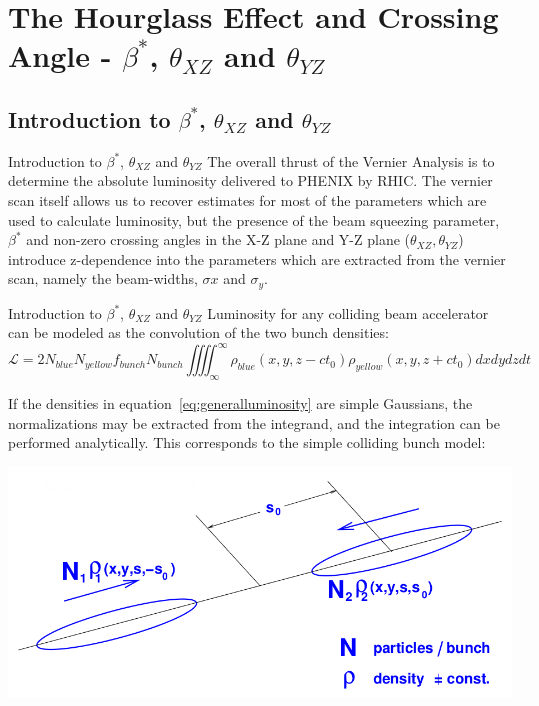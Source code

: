 \section{The Hourglass Effect and Crossing Angle - $\beta^{*}$,  $\theta_{XZ}$ and $\theta_{YZ}$ }
\label{HourglassIntro}

\subsection{Introduction to $\beta^{*}$,  $\theta_{XZ}$ and $\theta_{YZ}$ }
\label{HourglassSubIntro}

\begin{frame}{Introduction to $\beta^{*}$,  $\theta_{XZ}$ and $\theta_{YZ}$}
The overall thrust of the Vernier Analysis is to determine the absolute
luminosity delivered to PHENIX by RHIC. The vernier scan itself allows us to
recover estimates for most of the parameters which are used to calculate
luminosity, but the presence of the beam squeezing parameter, $\beta^{*}$ and
non-zero crossing angles in the X-Z plane and Y-Z plane ($\theta_{XZ},
\theta_{YZ}$) introduce z-dependence into the parameters which are extracted from
the vernier scan, namely the beam-widths, $\sigma{x}$ and $\sigma_{y}$. 
\end{frame}


\begin{frame}[shrink=20]{Introduction to $\beta^{*}$,  $\theta_{XZ}$ and $\theta_{YZ}$}
Luminosity for any colliding beam accelerator can be modeled as the convolution
of the two bunch densities:
\begin{equation}
\label{eq:generalluminosity}
\mathcal{L} = 2N_{blue}N_{yellow}f_{bunch}N_{bunch}\iiiint _{\infty}^{ \infty}{
\rho_{blue} (x,y,z-ct_0)\rho_{yellow} (x,y,z+ct_0)} dxdydzdt
\end{equation}

If the densities in equation~\ref{eq:generalluminosity} are simple Gaussians, the
normalizations may be extracted from the integrand, and the integration can be
performed analytically. This corresponds to the simple colliding bunch model:
\begin{center}
	\includegraphics[width=0.75\linewidth]{../HourglassIntro/figs/simple_bunch_head_on.png}
\label{fig:xing_bunch}
\end{center}
\end{frame}

